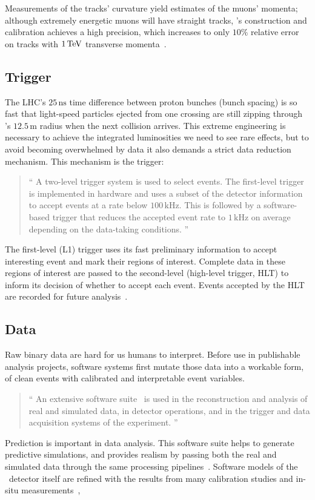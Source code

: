 Measurements of the tracks' curvature yield estimates of the muons' momenta;
although extremely energetic muons will have straight tracks,
\atlas's construction and calibration achieves a high precision, which
increases to only $10\%$ relative error on tracks with $1\,\eV[T]$ transverse
momenta~\cite{
atlas1994proposal,
atlas2008experiment,
ATL-PHYS-PUB-2015-037
}.


\subsection{Trigger}
\label{sec:atlas_trigger}
The LHC's $25\,\mathrm{ns}$ time difference between proton bunches
(bunch spacing) is so fast that light-speed particles ejected from one crossing
are still zipping through \atlas's $12.5\,\textrm{m}$ radius when the next
collision arrives.
This extreme engineering is necessary to achieve the integrated luminosities we
need to see rare effects, but to avoid becoming overwhelmed
by data it also demands a strict data reduction mechanism.
This mechanism is the trigger:
\begin{quote}
``%
A two-level trigger system is used to select events.
The first-level trigger is implemented in hardware and uses a subset of the
detector information to accept events at a rate below $100\,\mathrm{kHz}$.
This is followed by a software-based trigger that reduces the accepted event
rate to $1\,\mathrm{kHz}$ on average depending on the data-taking conditions.%
''~\cite{atlas2022searches}
\end{quote}
The first-level (L1) trigger uses its fast preliminary information to accept
interesting event and mark their regions of interest.
Complete data in these regions of interest are passed to the second-level
(high-level trigger, HLT) to inform its decision of whether to accept each
event.
Events accepted by the HLT are recorded for future analysis~\cite{
atlas2016trigger,
atlas2008experiment
}.


\subsection{Data}
\label{sec:atlas_data}
Raw binary data are hard for us humans to interpret.
Before use in publishable analysis projects, software systems first mutate
those data into a workable form, of clean events with calibrated and
interpretable event variables.
\begin{quote}
``%
An extensive software suite~\cite{ATL-SOFT-PUB-2021-001} is used in the
reconstruction and analysis of real and simulated data, in detector operations,
and in the trigger and data acquisition systems of the experiment.%
''~\cite{atlas2022searches}
\end{quote}
Prediction is important in data analysis.
This software suite helps to generate predictive simulations, and provides
realism by passing both the real and simulated data through the same processing
pipelines~\cite{SOFT-2010-01, geant2003}.
Software models of the \atlas\ detector itself are refined with the results from
many calibration studies and in-situ measurements~\cite{atlas2008experiment},

